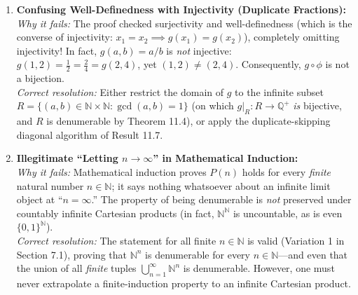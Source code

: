 \documentclass[11pt, letterpaper]{article}
\theoremstyle{definition}
\theoremstyle{remark}
\begin{document}
\begin{enumerate}[label=\textbf{Flaw \arabic*:}]
    \item \textbf{Confusing Well-Definedness with Injectivity (Duplicate Fractions):} \\
    \emph{Why it fails:} The proof checked surjectivity and well-definedness (which is the converse of injectivity: $x_1 = x_2 \implies g(x_1) = g(x_2)$), completely omitting injectivity! In fact, $g(a, b) = a/b$ is \emph{not} injective: $g(1, 2) = \frac{1}{2} = \frac{2}{4} = g(2, 4)$, yet $(1, 2) \neq (2, 4)$. Consequently, $g \circ \phi$ is not a bijection. \\
    \emph{Correct resolution:} Either restrict the domain of $g$ to the infinite subset $R = \{(a, b) \in \mathbb{N} \times \mathbb{N} : \gcd(a, b) = 1\}$ (on which $g|_R : R \to \mathbb{Q}^+$ \emph{is} bijective, and $R$ is denumerable by Theorem 11.4), or apply the duplicate-skipping diagonal algorithm of Result 11.7.

    \item \textbf{Illegitimate ``Letting $n \to \infty$'' in Mathematical Induction:} \\
    \emph{Why it fails:} Mathematical induction proves $P(n)$ holds for every \emph{finite} natural number $n \in \mathbb{N}$; it says nothing whatsoever about an infinite limit object at ``$n = \infty$.'' The property of being denumerable is \emph{not} preserved under countably infinite Cartesian products (in fact, $\mathbb{N}^{\mathbb{N}}$ is uncountable, as is even $\{0, 1\}^{\mathbb{N}}$). \\
    \emph{Correct resolution:} The statement for all finite $n \in \mathbb{N}$ is valid (Variation 1 in Section 7.1), proving that $\mathbb{N}^n$ is denumerable for every $n \in \mathbb{N}$---and even that the union of all \emph{finite} tuples $\bigcup_{n=1}^{\infty} \mathbb{N}^n$ is denumerable. However, one must never extrapolate a finite-induction property to an infinite Cartesian product.
\end{enumerate}
\end{document}
